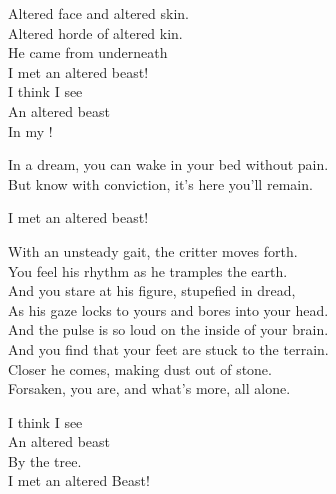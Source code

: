 Altered face and altered skin. \\
Altered horde of altered kin. \\

He came from underneath \\
I met an altered beast! \\

I think I see \\
An altered beast \\
In my ! \\


In a dream, you can wake in your bed without pain. \\
But know with conviction, it's here you'll remain. \\


I met an altered beast! \\


With an unsteady gait, the critter moves forth. \\
You feel his rhythm as he tramples the earth. \\

And you stare at his figure, stupefied in dread, \\
As his gaze locks to yours and bores into your head. \\

And the pulse is so loud on the inside of your brain. \\
And you find that your feet are stuck to the terrain. \\

Closer he comes, making dust out of stone. \\
Forsaken, you are, and what's more, all alone. \\


I think I see \\
An altered beast \\
By the tree. \\

I met an altered Beast! \\





